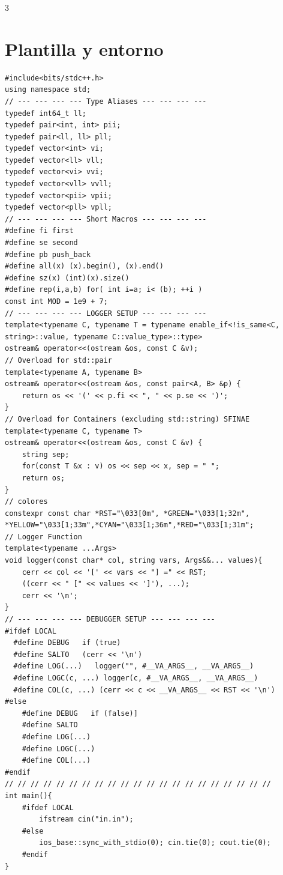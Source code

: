 \documentclass[8pt, spanish, mexico, letterpaper]{extarticle}
\newcommand{\<}{<}
\begin{document}
\begin{multicols*}{3}
\raggedcolumns


\section{Plantilla y entorno}

\begin{verbatim}
#include<bits/stdc++.h>
using namespace std;
// --- --- --- --- Type Aliases --- --- --- ---
typedef int64_t ll;
typedef pair<int, int> pii;
typedef pair<ll, ll> pll;
typedef vector<int> vi;
typedef vector<ll> vll;
typedef vector<vi> vvi;
typedef vector<vll> vvll;
typedef vector<pii> vpii;
typedef vector<pll> vpll;
// --- --- --- --- Short Macros --- --- --- ---
#define fi first
#define se second
#define pb push_back
#define all(x) (x).begin(), (x).end()
#define sz(x) (int)(x).size()
#define rep(i,a,b) for( int i=a; i< (b); ++i )
const int MOD = 1e9 + 7;
// --- --- --- --- LOGGER SETUP --- --- --- ---    
template<typename C, typename T = typename enable_if<!is_same<C, string>::value, typename C::value_type>::type>
ostream& operator<<(ostream &os, const C &v);
// Overload for std::pair
template<typename A, typename B>
ostream& operator<<(ostream &os, const pair<A, B> &p) {
    return os << '(' << p.fi << ", " << p.se << ')';
}
// Overload for Containers (excluding std::string) SFINAE
template<typename C, typename T>
ostream& operator<<(ostream &os, const C &v) {
    string sep;
    for(const T &x : v) os << sep << x, sep = " ";
    return os;
}
// colores
constexpr const char *RST="\033[0m", *GREEN="\033[1;32m", 
*YELLOW="\033[1;33m",*CYAN="\033[1;36m",*RED="\033[1;31m";
// Logger Function
template<typename ...Args>
void logger(const char* col, string vars, Args&&... values){
    cerr << col << '[' << vars << "] =" << RST;
    ((cerr << " [" << values << ']'), ...);
    cerr << '\n';
}
// --- --- --- --- DEBUGGER SETUP --- --- --- ---    
#ifdef LOCAL
  #define DEBUG   if (true)
  #define SALTO   (cerr << '\n')  
  #define LOG(...)   logger("", #__VA_ARGS__, __VA_ARGS__)
  #define LOGC(c, ...) logger(c, #__VA_ARGS__, __VA_ARGS__)    
  #define COL(c, ...) (cerr << c << __VA_ARGS__ << RST << '\n')
#else
    #define DEBUG   if (false)]
    #define SALTO
    #define LOG(...)
    #define LOGC(...)
    #define COL(...)
#endif
// // // // // // // // // // // // // // // // // // // // //
int main(){
    #ifdef LOCAL
        ifstream cin("in.in");
    #else
        ios_base::sync_with_stdio(0); cin.tie(0); cout.tie(0);
    #endif 
}
\end{verbatim}



\end{multicols*}
\end{document}
